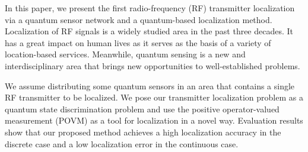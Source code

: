 In this paper, we present the first radio-frequency (RF) transmitter localization via a quantum sensor network and a quantum-based localization method. 
Localization of RF signals is a widely studied area in the past three decades. 
It has a great impact on human lives as
it serves as the basis of a variety of location-based services.
Meanwhile, quantum sensing is a new and interdisciplinary area that brings new opportunities to well-established problems.

We assume distributing some quantum sensors in an area that contains a single RF transmitter to be localized. 
We pose our transmitter localization problem as a quantum state discrimination problem and use the positive operator-valued measurement (POVM) as a tool for localization in a novel way.
Evaluation results show that our proposed method achieves a high localization accuracy in the discrete case and a low localization error in the continuous case.

